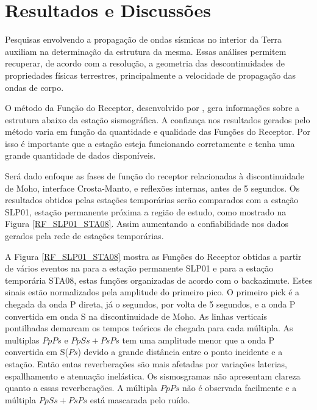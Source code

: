 \chapter{Resultados e Discussões}

Pesquisas envolvendo a propagação de ondas sísmicas no interior da Terra auxiliam na determinação da estrutura da mesma. Essas análises permitem recuperar, de acordo com a resolução, a geometria das descontinuidades de propriedades físicas terrestres, principalmente a velocidade de propagação das ondas de corpo.  

O método da Função do Receptor, desenvolvido por \cite{Langston_1977}, gera informações sobre a estrutura abaixo da estação sismográfica. A confiança nos resultados gerados pelo método varia em função da quantidade e qualidade das Funções do Receptor. Por isso é importante que a estação esteja funcionando corretamente e tenha uma grande quantidade de dados disponíveis.

Será dado enfoque as fases de função do receptor relacionadas à discontinuidade de Moho, interface Crosta-Manto, e reflexões  internas, antes de 5 segundos. Os resultados obtidos pelas estações temporárias serão comparados com a estação SLP01, estação permanente próxima a região de estudo, como mostrado na Figura \ref{RF_SLP01_STA08}. Assim aumentando a confiabilidade nos dados gerados pela rede de estações temporárias.

A Figura \ref{RF_SLP01_STA08} mostra as Funções do Receptor obtidas a partir de vários eventos na para a estação permanente SLP01 e para a estação temporária STA08, estas funções organizadas de acordo com o backazimute. Estes sinais estão normalizados pela amplitude do primeiro pico. O primeiro pick é a chegada da onda P direta, já o segundos, por volta de 5 segundos, e a onda P convertida em onda S na discontinuidade de Moho. As linhas verticais pontilhadas demarcam os tempos teóricos de chegada para cada múltipla. As multiplas $PpPs$ e $PpSs+PsPs$ tem uma amplitude menor que a onda P convertida em S($Ps$) devido a grande distância entre o ponto incidente e a estação. Então entas reverberações são mais afetadas por variações laterias, espallhamento e atenuação inelástica. Os sismosgramas não apresentam clareza quanto a essas reverberações. A múltipla $PpPs$ não é observada facilmente e a múltipla $PpSs+PsPs$ está mascarada pelo ruído.


